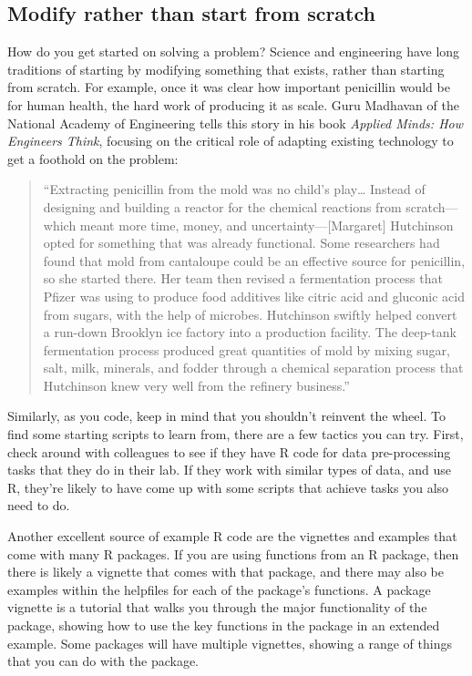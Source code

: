 \documentclass[]{tufte-book}
\begin{document}
\subsection{Modify rather than start from scratch}\label{modify-rather-than-start-from-scratch}

How do you get started on solving a problem? Science and engineering have long
traditions of starting by modifying something that exists, rather than starting
from scratch. For example, once it was clear how important penicillin would be
for human health, the hard work of producing it as scale. Guru Madhavan of the
National Academy of Engineering tells this story in his book \emph{Applied Minds: How
Engineers Think}, focusing on the critical role of adapting existing technology
to get a foothold on the problem:

\begin{quote}
``Extracting penicillin from the mold was no child's play\ldots{} Instead of
designing and building a reactor for the chemical reactions from scratch---which
meant more time, money, and uncertainty---{[}Margaret{]} Hutchinson opted for
something that was already functional. Some researchers had found that mold from
cantaloupe could be an effective source for penicillin, so she started there.
Her team then revised a fermentation process that Pfizer was using to produce
food additives like citric acid and gluconic acid from sugars, with the help of
microbes. Hutchinson swiftly helped convert a run-down Brooklyn ice factory into
a production facility. The deep-tank fermentation process produced great
quantities of mold by mixing sugar, salt, milk, minerals, and fodder through a
chemical separation process that Hutchinson knew very well from the refinery
business.'' \citep{madhavan2015applied}
\end{quote}

Similarly, as you code, keep in mind that you shouldn't reinvent the wheel. To
find some starting scripts to learn from, there are a few tactics you can try.
First, check around with colleagues to see if they have R code for data
pre-processing tasks that they do in their lab. If they work with similar types
of data, and use R, they're likely to have come up with some scripts that
achieve tasks you also need to do.

Another excellent source of example R code are the vignettes and examples that
come with many R packages. If you are using functions from an R package, then
there is likely a vignette that comes with that package, and there may also be
examples within the helpfiles for each of the package's functions. A package
vignette is a tutorial that walks you through the major functionality of the
package, showing how to use the key functions in the package in an extended
example. Some packages will have multiple vignettes, showing a range of things
that you can do with the package.
\end{document}
